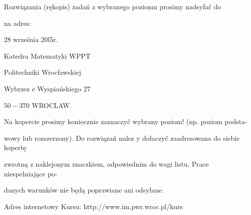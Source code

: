 \documentclass[a4paper,12pt]{article}
\begin{document}
Rozwiązania (rękopis) zadań z wybranego poziomu prosimy nadsyfač do

na adres:

28 września 20l5r.

Katedra Matematyki WPPT

Politechniki Wrocfawskiej

Wybrzez $\mathrm{e}$ Wyspiańskiego 27

$50-370$ WROCLAW.

Na kopercie prosimy $\underline{\mathrm{k}\mathrm{o}\mathrm{n}\mathrm{i}\mathrm{e}\mathrm{c}\mathrm{z}\mathrm{n}\mathrm{i}\mathrm{e}}$ zaznaczyč wybrany poziom! (np. poziom podsta-

wowy lub rozszerzony). Do rozwiązań nalez $\mathrm{y}$ dołaczyč zaadresowana do siebie kopertę

zwrotną $\mathrm{z}$ naklejonym znaczkiem, odpowiednim do wagi listu. Prace niespelniające po-

danych warunków nie będą poprawiane ani odsyłane.

Adres internetowy Kursu: http://www.im.pwr.wroc.pl/kurs
\end{document}
